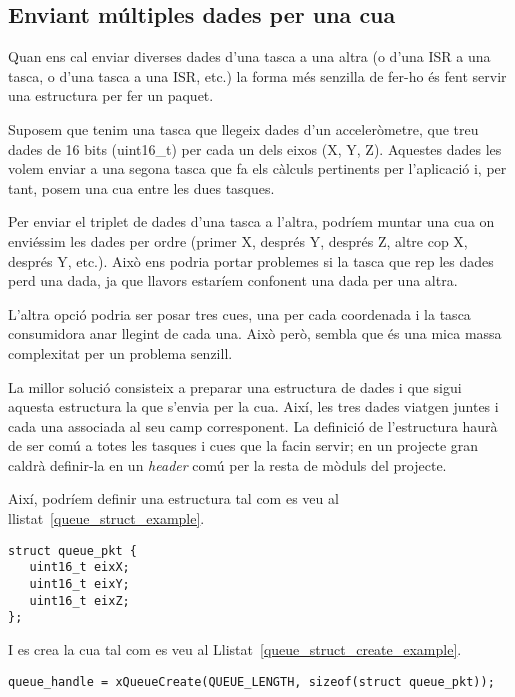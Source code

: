 \subsection{Enviant múltiples dades per una cua}
\label{sub:dades_cua}

Quan ens cal enviar diverses dades d'una tasca a una altra (o d'una ISR a una tasca, o d'una tasca a una ISR, etc.) la forma més senzilla de fer-ho és fent servir una estructura per fer un paquet.

Suposem que tenim una tasca que llegeix dades d'un acceleròmetre, que treu dades de 16 bits (uint16\_t) per cada un dels eixos (X, Y, Z). Aquestes dades les volem enviar a una segona tasca que fa els càlculs pertinents per l'aplicació i, per tant, posem una cua entre les dues tasques.

Per enviar el triplet de dades d'una tasca a l'altra, podríem muntar una cua on enviéssim les dades per ordre (primer X, després Y, després Z, altre cop X, després Y, etc.). Això ens podria portar problemes si la tasca que rep les dades perd una dada, ja que llavors estaríem confonent una dada per una altra.

L'altra opció podria ser posar tres cues, una per cada coordenada i la tasca consumidora anar llegint de cada una. Això però, sembla que és una mica massa complexitat per un problema senzill.

La millor solució consisteix a preparar una estructura de dades i que sigui aquesta estructura la que s'envia per la cua. Així, les tres dades viatgen juntes i cada una associada al seu camp corresponent. La definició de l'estructura haurà de ser comú a totes les tasques i cues que la facin servir; en un projecte gran caldrà definir-la en un {\em header} comú per la resta de mòduls del projecte.

Així, podríem definir una estructura tal com es veu al llistat~\ref{queue_struct_example}.

\begin{lstlisting}[style=customc, label=queue_struct_example, caption=Paquet dins d'estructura,floatplacement=h! ]
struct queue_pkt {
   uint16_t eixX;
   uint16_t eixY;
   uint16_t eixZ;
};
\end{lstlisting}

I es crea la cua tal com es veu al Llistat~\ref{queue_struct_create_example}.

\begin{lstlisting}[style=customc, label=queue_struct_create_example, caption=Creació de la cua amb un paquet de dades,floatplacement=h!]
queue_handle = xQueueCreate(QUEUE_LENGTH, sizeof(struct queue_pkt));
\end{lstlisting}


